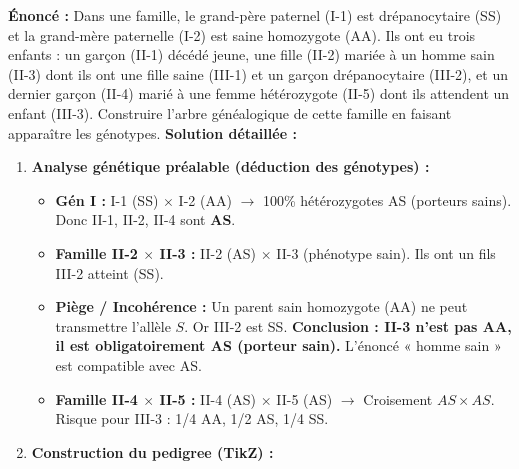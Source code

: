 \documentclass[11pt]{article}
\begin{document}
\begin{exoresolu}
    \textbf{Énoncé :} Dans une famille, le grand-père paternel (I-1) est drépanocytaire (SS) et la grand-mère paternelle (I-2) est saine homozygote (AA). Ils ont eu trois enfants : un garçon (II-1) décédé jeune, une fille (II-2) mariée à un homme sain (II-3) dont ils ont une fille saine (III-1) et un garçon drépanocytaire (III-2), et un dernier garçon (II-4) marié à une femme hétérozygote (II-5) dont ils attendent un enfant (III-3). Construire l'arbre généalogique de cette famille en faisant apparaître les génotypes.
    \tcblower
    \textbf{Solution détaillée :}
    \begin{enumerate}
        \item \textbf{Analyse génétique préalable (déduction des génotypes) :}
              \begin{itemize}
                  \item \textbf{Gén I :} I-1 (SS) $\times$ I-2 (AA) $\rightarrow$ 100\% hétérozygotes AS (porteurs sains). Donc II-1, II-2, II-4 sont \textbf{AS}.
                  \item \textbf{Famille II-2 $\times$ II-3 :} II-2 (AS) $\times$ II-3 (phénotype sain). Ils ont un fils III-2 atteint (SS).
                  \item \textbf{Piège / Incohérence :} Un parent sain homozygote (AA) ne peut transmettre l'allèle $S$. Or III-2 est SS. \textbf{Conclusion : II-3 n'est pas AA, il est obligatoirement AS (porteur sain).} L'énoncé « homme sain » est compatible avec AS.
                  \item \textbf{Famille II-4 $\times$ II-5 :} II-4 (AS) $\times$ II-5 (AS) $\rightarrow$ Croisement $AS \times AS$. Risque pour III-3 : 1/4 AA, 1/2 AS, 1/4 SS.
              \end{itemize}
        \item \textbf{Construction du pedigree (TikZ) :}
    \end{enumerate}
    \begin{popfigure}
\end{popfigure}
\end{exoresolu}
\end{document}
